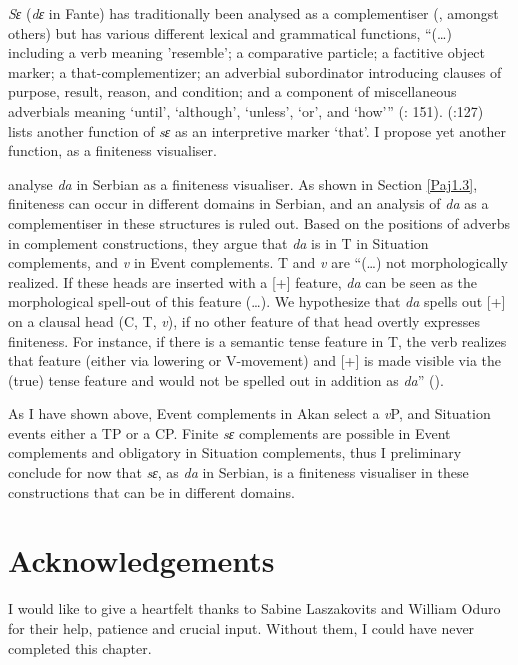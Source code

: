 \documentclass[output=paper]{langscibook}
\begin{document}
\emph{Sɛ} (\emph{dɛ} in Fante) has traditionally been analysed as a complementiser (\citealt{lord1993}, \citealt{boadi1972} \citealt{osam1998} amongst others) but has various different lexical and grammatical functions, “(…) including a verb meaning 'resemble'; a comparative particle; a factitive object marker; a that-complementizer; an adverbial subordinator introducing clauses of purpose, result, reason, and condition; and a component of miscellaneous adverbials meaning `until', `although', `unless', `or', and `how'” (\citealt{lord1993}: 151). \citeauthor{agyekum2002} (\citeyear{agyekum2002}:127) lists another function of \emph{sɛ} as an interpretive marker `that'. I propose yet another function, as a finiteness visualiser.

\citet{todorovickwurmbrand2020} analyse \emph{da} in Serbian as a finiteness visualiser. As shown in Section \ref{Paj1.3}, finiteness can occur in different domains in Serbian, and an analysis of \emph{da} as a complementiser in these structures is ruled out. Based on the positions of adverbs in complement constructions, they argue that \emph{da} is in T in Situation complements, and \emph{v} in Event complements. T and \emph{v} are “(…) not morphologically realized. If these heads are inserted with a [+] feature, \emph{da} can be seen as the morphological spell-out of this feature (…). We hypothesize that \emph{da} spells out [+] on a clausal head (C, T, \emph{v}), if no other feature of that head overtly expresses finiteness. For instance, if there is a semantic tense feature in T, the verb realizes that feature (either via lowering or V-movement) and [+] is made visible via the (true) tense feature and would not be spelled out in addition as \emph{da}” (\citealt{todorovickwurmbrand2020}).

As I have shown above, Event complements in Akan select a \emph{v}P, and Situation events either a TP or a CP. Finite \emph{sɛ} complements are possible in Event complements and obligatory in Situation complements, thus I preliminary conclude for now that \emph{sɛ}, as \emph{da} in Serbian, is a finiteness visualiser in these constructions that can be in different domains. 


\begin{comment}
\newpage
\section*{Abbreviations}
\begin{tabularx}{.45\textwidth}{lQ}
... & \\
... & \\
\end{tabularx}
\begin{tabularx}{.45\textwidth}{lQ}
... & \\
... & \\
\end{tabularx}
\end{comment}

\section*{Acknowledgements}
I would like to give a heartfelt thanks to Sabine Laszakovits and William Oduro for their help, patience and crucial input. Without them, I could have never completed this chapter.

\printbibliography[heading=subbibliography,notkeyword=this]
\end{document}
